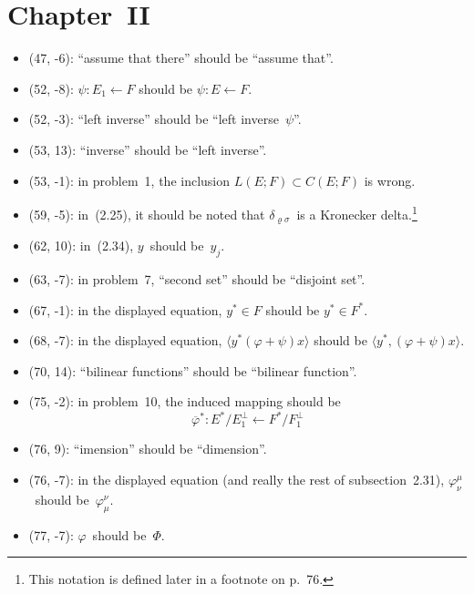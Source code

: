\documentclass[letterpaper,12pt]{article}
\newcommand{\from}{\leftarrow}
\newcommand{\sprod}[2]{\langle#1,#2\rangle}
\newcommand{\oc}[1]{#1^{\perp}}
\newcommand{\proj}[1]{\overline{#1}}
\begin{document}
\section*{Chapter~II}
\begin{itemize}
\item (47, -6): ``assume that there'' should be ``assume that''.
\item (52, -8): \(\psi:E_1\from F\) should be \(\psi:E\from F\).
\item (52, -3): ``left inverse'' should be ``left inverse~\(\psi\)''.
\item (53, 13): ``inverse'' should be ``left inverse''.
\item (53, -1): in problem~1, the inclusion \(L(E;F)\subset C(E;F)\) is wrong.
\item (59, -5): in~(2.25), it should be noted that \(\delta_{\varrho\sigma}\)~is a Kronecker delta.\footnote{This notation is defined later in a footnote on p.~76.}
\item (62, 10): in~(2.34), \(y\)~should be~\(y_j\).
\item (63, -7): in problem~7, ``second set'' should be ``disjoint set''.
\item (67, -1): in the displayed equation, \(y^*\in F\) should be \(y^*\in F^*\).
\item (68, -7): in the displayed equation, \(\langle y^*(\varphi+\psi)x\rangle\) should be \(\sprod{y^*}{(\varphi+\psi)x}\).
\item (70, 14): ``bilinear functions'' should be ``bilinear function''.
\item (75, -2): in problem~10, the induced mapping should be
\[\proj{\varphi}^*:E^*/\oc{E_1}\from F^*/\oc{F_1}\]
\item (76, 9): ``imension'' should be ``dimension''.
\item (76, -7): in the displayed equation (and really the rest of subsection~2.31), \(\varphi^{\mu}_{\nu}\)~should be~\(\varphi^{\nu}_{\mu}\).
\item (77, -7): \(\varphi\)~should be~\(\Phi\).
\end{itemize}
\end{document}

